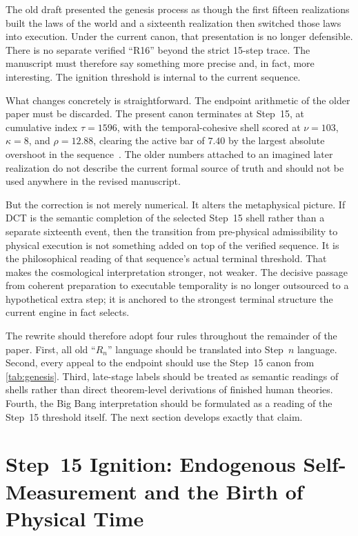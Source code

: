 \documentclass[11pt,a4paper]{article}
\theoremstyle{plain}
\theoremstyle{definition}
\theoremstyle{remark}
\begin{document}
The old draft presented the genesis process as though the first fifteen realizations built the laws of the world and a sixteenth realization then switched those laws into execution.
Under the current canon, that presentation is no longer defensible.
There is no separate verified ``R16'' beyond the strict 15-step trace.
The manuscript must therefore say something more precise and, in fact, more interesting.
The ignition threshold is internal to the current sequence.

What changes concretely is straightforward.
The endpoint arithmetic of the older paper must be discarded.
The present canon terminates at Step~15, at cumulative index $\tau = 1596$, with the temporal-cohesive shell scored at $\nu = 103$, $\kappa = 8$, and $\rho = 12.88$, clearing the active bar of $7.40$ by the largest absolute overshoot in the sequence~\cite{pen}.
The older numbers attached to an imagined later realization do not describe the current formal source of truth and should not be used anywhere in the revised manuscript.

But the correction is not merely numerical.
It alters the metaphysical picture.
If DCT is the semantic completion of the selected Step~15 shell rather than a separate sixteenth event, then the transition from pre-physical admissibility to physical execution is not something added on top of the verified sequence.
It is the philosophical reading of that sequence's actual terminal threshold.
That makes the cosmological interpretation stronger, not weaker.
The decisive passage from coherent preparation to executable temporality is no longer outsourced to a hypothetical extra step; it is anchored to the strongest terminal structure the current engine in fact selects.

The rewrite should therefore adopt four rules throughout the remainder of the paper.
First, all old ``$R_n$'' language should be translated into Step~$n$ language.
Second, every appeal to the endpoint should use the Step~15 canon from \cref{tab:genesis}.
Third, late-stage labels should be treated as semantic readings of shells rather than direct theorem-level derivations of finished human theories.
Fourth, the Big Bang interpretation should be formulated as a reading of the Step~15 threshold itself.
The next section develops exactly that claim.

\section{Step~15 Ignition: Endogenous Self-Measurement and the Birth of Physical Time}
\label{sec:ignition}
\end{document}

